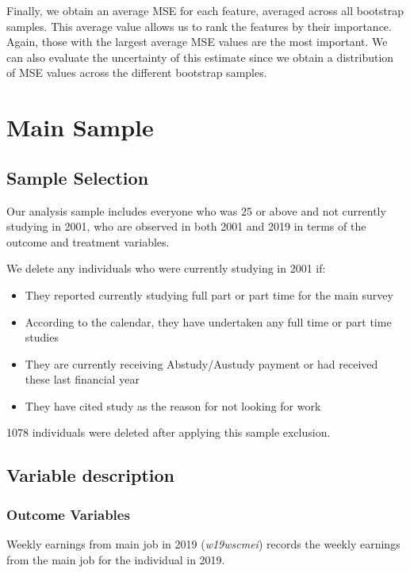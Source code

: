 \documentclass[12pt, a4paper]{article}
\begin{document}
Finally, we obtain an average MSE for each feature, averaged across all
bootstrap samples. This average value allows us to rank the features by their
importance. Again, those with the largest average MSE values are the most
important. We can also evaluate the uncertainty of this estimate since we
obtain a distribution of MSE values across the different bootstrap samples.

\clearpage

\renewcommand{\appendixname}{Online Appendix}

\section{Main Sample}
\label{app:main}

\subsection{Sample Selection}

Our analysis sample includes everyone who was 25 or above and not currently studying in 2001, who are observed in both 2001 and 2019 in terms of the outcome and treatment variables. 

We delete any individuals who were currently studying in 2001 if:
\begin{itemize}
  \item They reported currently studying full part or part time for the main survey 
  \item According to the calendar, they have undertaken any full time or part time studies
  \item They are currently receiving Abstudy/Austudy payment or had received these last financial year 
  \item They have cited study as the reason for not looking for work 
\end{itemize}

1078 individuals were deleted after applying this sample exclusion.

\subsection{Variable description}

\subsubsection{Outcome Variables}
Weekly earnings from main job in 2019 (\textit{w19\textunderscore{}wscmei}) records the weekly earnings from the main job for the individual in 2019. 
\end{document}
